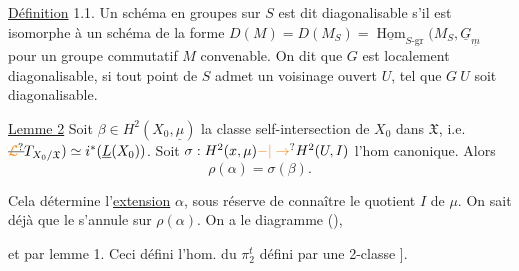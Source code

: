 \uline{Définition} 1.1. Un schéma en groupes  sur $S$ est dit diagonalisable s'il est isomorphe à un schéma de la forme  $D(M)=D(M_S)=\underline{\operatorname{Hom}}_{S\text{-gr}}(M_S,\underline G_{\underline m}$ pour un groupe commutatif $M$ convenable. On dit que $G$ est localement diagonalisable, si tout point de $S$ admet un voisinage ouvert $U$, tel que $G\ U$ soit diagonalisable.


\uline{Lemme 2} Soit $\beta\in H^2(X_0,\underline\mu)$ la classe self-intersection de $X_0$ dans $\mathfrak X$, i.e.  $\deleted{\unsure{\mathcal L}}T_{X_0/\mathfrak X})\simeq i^*(\underline L(X_0))$. Soit $\sigma:H^2(x,\mu)\unsure{-|\to}H^2(U,I)$ l'hom canonique. Alors
\[
 \rho(\alpha)=\sigma(\beta).
\]

Cela détermine l'\uline{extension} $\alpha$, sous réserve de connaître le quotient $I$ de $\mu$. On sait déjà que le 
s'annule sur $\rho(\alpha)$. On a le diagramme (),

et par lemme 1. Ceci  \unsure{---} défini l'hom.  du $\pi_2^t$ défini par une 2-classe ].

